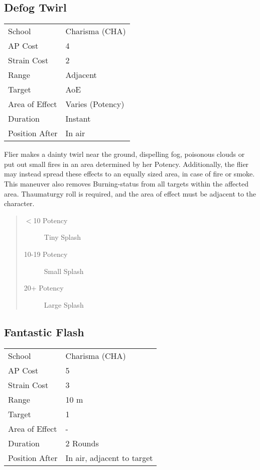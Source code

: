 \documentclass[11pt,a4paper,twocolumn]{book}
\begin{document}
\subsection*{Defog Twirl}
{
	\begin{tabu} to 75mm{| X[l,4] | X[l,7] |}
		\hline
		School 			& Charisma (CHA) 	\\
		AP Cost	      	& 4			 		\\
		Strain Cost     & 2 				\\
		Range     		& Adjacent			\\
		Target      	& AoE 				\\
		Area of Effect  & Varies (Potency) 	\\
		Duration     	& Instant 	 		\\
		Position After  & In air 			\\ \hline
	\end{tabu}
	
}

\medskip

Flier makes a dainty twirl near the ground, dispelling fog, poisonous clouds or put out small fires in an area determined by her Potency. Additionally, the flier may instead spread these effects to an equally sized area, in case of fire or smoke. This maneuver also removes Burning-status from all targets within the affected area. Thaumaturgy roll is required, and the area of effect must be adjacent to the character.

\begin{quote}
	\begin{description}
		\item[$<$10 Potency] 	Tiny Splash
		\item[10-19 Potency] 	Small Splash
		\item[20+ Potency] 	Large Splash
	\end{description}
\end{quote}

\medskip

\subsection*{Fantastic Flash}
{
	\begin{tabu} to 75mm{| X[l,4] | X[l,7] |}
		\hline
		School 			& Charisma (CHA) 	\\
		AP Cost	      	& 5 				\\
		Strain Cost     & 3 				\\
		Range     		& 10 m 				\\
		Target      	& 1 				\\
		Area of Effect  & - 	 			\\
		Duration     	& 2 Rounds	 		\\
		Position After  & In air, adjacent to target 			\\ \hline
	\end{tabu}
	
}
\end{document}
